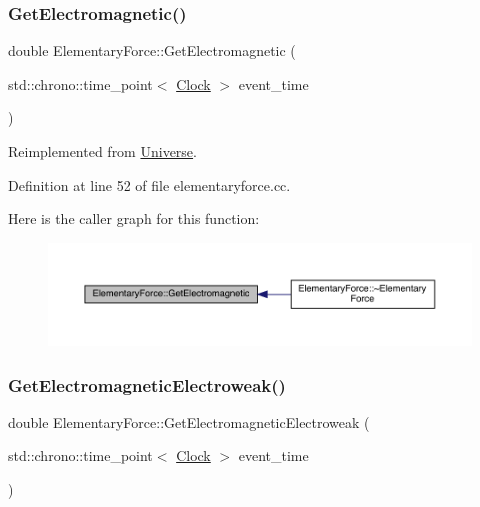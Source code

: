 \subsubsection{\texorpdfstring{Get\+Electromagnetic()}{GetElectromagnetic()}}
{\footnotesize\ttfamily double Elementary\+Force\+::\+Get\+Electromagnetic (\begin{DoxyParamCaption}\item[{std\+::chrono\+::time\+\_\+point$<$ \hyperlink{universe_8h_a0ef8d951d1ca5ab3cfaf7ab4c7a6fd80}{Clock} $>$}]{event\+\_\+time }\end{DoxyParamCaption})\hspace{0.3cm}{\ttfamily [virtual]}}



Reimplemented from \hyperlink{class_universe_a63b850ef3f3394313353109d222bf5d1}{Universe}.



Definition at line 52 of file elementaryforce.\+cc.

Here is the caller graph for this function\+:
\nopagebreak
\begin{figure}[H]
\begin{center}
\leavevmode
\includegraphics[width=350pt]{class_elementary_force_a2c8bc3226f42710717775c73eee1644e_icgraph}
\end{center}
\end{figure}
\mbox{\label{class_elementary_force_a58e503f2f3a7410f034a2a04bca560d1}} 
\subsubsection{\texorpdfstring{Get\+Electromagnetic\+Electroweak()}{GetElectromagneticElectroweak()}}
{\footnotesize\ttfamily double Elementary\+Force\+::\+Get\+Electromagnetic\+Electroweak (\begin{DoxyParamCaption}\item[{std\+::chrono\+::time\+\_\+point$<$ \hyperlink{universe_8h_a0ef8d951d1ca5ab3cfaf7ab4c7a6fd80}{Clock} $>$}]{event\+\_\+time }\end{DoxyParamCaption})\hspace{0.3cm}{\ttfamily [virtual]}}



